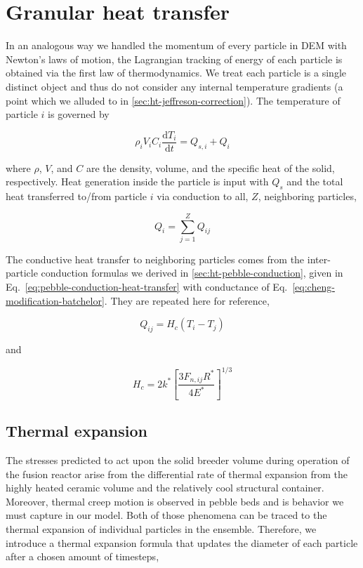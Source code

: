 \section{Granular heat transfer}\label{sec:dem-heat-transfer}

In an analogous way we handled the momentum of every particle in DEM with Newton's laws of motion, the Lagrangian tracking of energy of each particle is obtained via the first law of thermodynamics. We treat each particle is a single distinct object and thus do not consider any internal temperature gradients (a point which we alluded to in \cref{sec:ht-jeffreson-correction}). The temperature of particle $i$ is governed by

\begin{equation}\label{eq:thermoFirstLaw}
	\rho_iV_iC_i\frac{\mathrm{d}T_i}{\mathrm{d}t} = Q_{s,i} + Q_{i}
\end{equation}

where $\rho$, $V$, and $C$ are the density, volume, and the specific heat of the solid, respectively. Heat generation inside the particle is input with $Q_{s}$ and the total heat transferred to/from particle $i$ via conduction to all, $Z$, neighboring particles,

\begin{equation}
	Q_i = \sum_{j=1}^Z Q_{ij}
\end{equation}

The conductive heat transfer to neighboring particles comes from the inter-particle conduction formulas we derived in \cref{sec:ht-pebble-conduction}, given in Eq.~\ref{eq:pebble-conduction-heat-transfer} with conductance of Eq.~\ref{eq:cheng-modification-batchelor}. They are repeated here for reference,

\begin{equation*}
	Q_{ij} = H_c(T_i - T_j)
\end{equation*} 

and

\begin{equation}\label{eq:dem-conductance}
	H_c= 2k^*\left[\frac{3F_{n,ij}R^*}{4E^*}\right]^{1/3}
\end{equation}

\subsection{Thermal expansion}
The stresses predicted to act upon the solid breeder volume during operation of the fusion reactor arise from the differential rate of thermal expansion from the highly heated ceramic volume and the relatively cool structural container. Moreover, thermal creep motion is observed in pebble beds\cite{Tanigawa:2010cr, Vargas2007, Chen2009, Divoux2008} and is behavior we must capture in our model. Both of those phenomena can be traced to the thermal expansion of individual particles in the ensemble. Therefore, we introduce a thermal expansion formula that updates the diameter of each particle after a chosen amount of timesteps,

